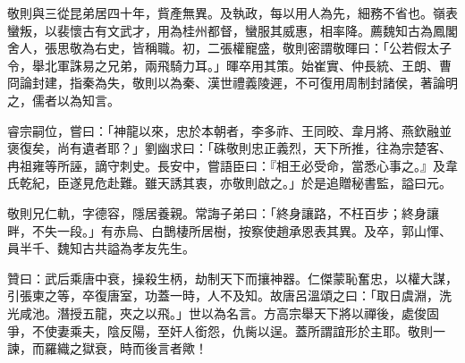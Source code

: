 \begin{pinyinscope}
 敬則與三從昆弟居四十年，貲產無異。及執政，每以用人為先，細務不省也。嶺表蠻叛，以裴懷古有文武才，用為桂州都督，蠻服其威惠，相率降。薦魏知古為鳳閣舍人，張思敬為右史，皆稱職。初，二張權寵盛，敬則密謂敬暉曰：「公若假太子令，舉北軍誅易之兄弟，兩飛騎力耳。」暉卒用其策。始崔實、仲長統、王朗、曹冏論封建，指秦為失，敬則以為秦、漢世禮義陵遲，不可復用周制封諸侯，著論明之，儒者以為知言。



 睿宗嗣位，嘗曰：「神龍以來，忠於本朝者，李多祚、王同晈、韋月將、燕欽融並褒復矣，尚有遺者耶？」劉幽求曰：「硃敬則忠正義烈，天下所推，往為宗楚客、冉祖雍等所誣，謫守刺史。長安中，嘗語臣曰：『相王必受命，當悉心事之。』及韋氏乾紀，臣遂見危赴難。雖天誘其衷，亦敬則啟之。」於是追贈秘書監，謚曰元。



 敬則兄仁軌，字德容，隱居養親。常誨子弟曰：「終身讓路，不枉百步；終身讓畔，不失一段。」有赤烏、白鵲棲所居樹，按察使趙承恩表其異。及卒，郭山惲、員半千、魏知古共謚為孝友先生。



 贊曰：武后乘唐中衰，操殺生柄，劫制天下而攘神器。仁傑蒙恥奮忠，以權大謀，引張柬之等，卒復唐室，功蓋一時，人不及知。故唐呂溫頌之曰：「取日虞淵，洗光咸池。潛授五龍，夾之以飛。」世以為名言。方高宗舉天下將以禪後，處俊固爭，不使妻乘夫，陰反陽，至奸人銜怨，仇胔以逞。蓋所謂誼形於主耶。敬則一諫，而羅織之獄衰，時而後言者歟！



\end{pinyinscope}